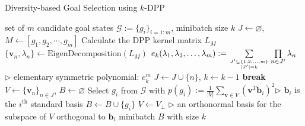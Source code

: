 \begin{algorithm}[t!]
\caption{Diversity-based Goal Selection using $k$-DPP}
\label{alg:goal_sample}
\begin{algorithmic}[1]
 \REQUIRE set of $m$ candidate goal states $\mathcal{G}:=\{g_{i}\}_{i=1:m}$, minibatch size $k$
 \STATE $J \leftarrow\varnothing$, $M \leftarrow  [g_{1}, g_{2}, \cdots, g_{m}]$
 \STATE Calculate the DPP kernel matrix $L_M$
 \STATE $\{\boldsymbol{v}_{n}, \lambda_{n}\} \leftarrow \text{EigenDecomposition}(L_M)$
 \STATE $e_k(\lambda_1,\lambda_2,\dots,\lambda_m) := 
  \sum\limits_{J^{\prime} \subseteq \{1,2,\dots,m\}\atop|J^{\prime}|=k} \prod\limits_{n \in J^{\prime}} \lambda_n$ \hfill{$\triangleright$ elementary symmetric polynomial: $e^{m}_{k}$}
 \STATE $J \leftarrow J \cup \{n\}$, $k \leftarrow k - 1$
 \STATE \textbf{break}
 \ENDIF
 \ENDIF
 \ENDFOR
 \STATE $V \leftarrow \{\boldsymbol{v}_{n}\}_{n \in J}$, $B \leftarrow \varnothing$
 \STATE Select $g_{i}$ from $\mathcal{G}$ with $p(g_{i}):=\frac{1}{|V|}\sum_{\boldsymbol{v}\in V}(\boldsymbol{v}^{T}\boldsymbol{b}_{i})^{2}$\hfill{$\triangleright$ $\boldsymbol{b}_{i}$ is the $i^{\text{th}}$ standard basis}
 \STATE $B \leftarrow B \cup \{g_{i}\}$
 \STATE $V \leftarrow V_{\perp}$ \hfill{$\triangleright$ an orthonormal basis for the subspace of $V$ orthogonal to $\boldsymbol{b}_{i}$}
 \ENDWHILE
 \RETURN minibatch $B$ with size $k$
\end{algorithmic}
\end{algorithm}

